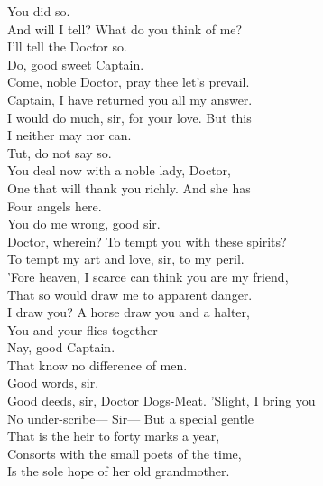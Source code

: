 \documentclass[a4paper,oneside,12pt]{memoir}
\begin{document}
\begin{drama*}
\facespeaks {} You did so.\\
\dapperspeaks And will I tell? What do you think of me?\\
\facespeaks I'll tell the Doctor so.\\
\dapperspeaks {} Do, good sweet Captain.\\
\facespeaks Come, noble Doctor, pray thee let's prevail.\\
\subtlespeaks Captain, I have returned you all my answer.\\
I would do much, sir, for your love. But this\\
I neither may nor can.\\
\facespeaks {} Tut, do not say so.\\
You deal now with a noble lady, Doctor,\\
One that will thank you richly. And she has\\
Four angels here.\\
\subtlespeaks {} You do me wrong, good sir.\\
\facespeaks Doctor, wherein? To tempt you with these spirits?\\
\subtlespeaks To tempt my art and love, sir, to my peril.\\
'Fore heaven, I scarce can think you are my friend,\\
That so would draw me to apparent danger.\\
\facespeaks I draw you? A horse draw you and a halter,\\
You and your flies together---\\
\dapperspeaks {} Nay, good Captain.\\
\facespeaks That know no difference of men.\\
\subtlespeaks {} Good words, sir.\\
\facespeaks Good deeds, sir, Doctor Dogs-Meat. 'Slight, I bring you\\
No under-scribe---
\dapperspeaks {} Sir---
\facespeaks {} But a special gentle\\
That is the heir to forty marks a year,\\
Consorts with the small poets of the time,\\
Is the sole hope of her old grandmother.\\

\end{drama*}
\end{document}
